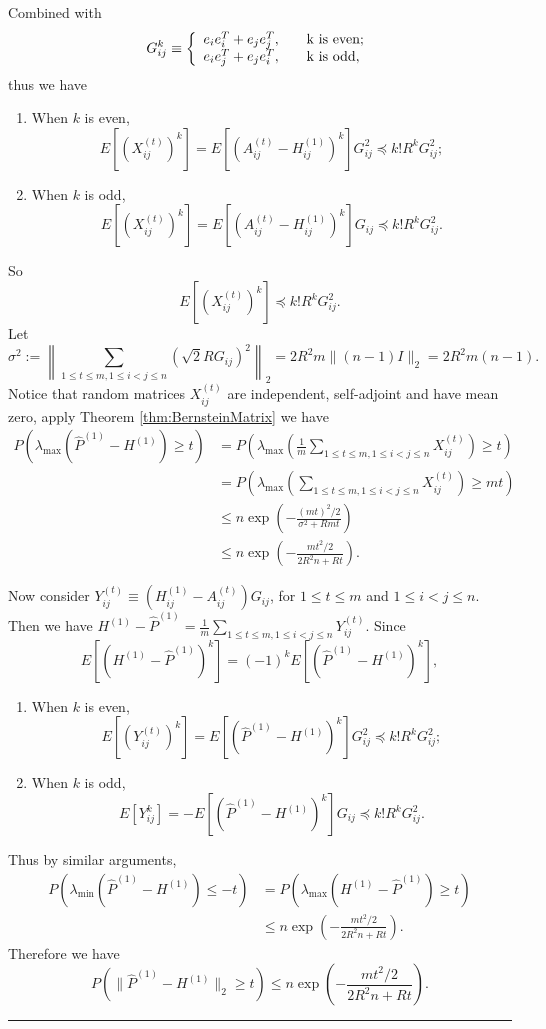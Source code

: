 \documentclass[a4paper]{article}
\newenvironment{proof}{{\bf Proof:  }}{\hfill\rule{2mm}{2mm}}
\begin{document}
\begin{proof}
Combined with
\[
    G_{ij}^k \equiv \left\{
    \begin{array}{l l}
        e_i e_i^T + e_j e_j^T, \quad & $k$ \text{ is even};\\
        e_i e_j^T + e_j e_i^T, \quad & $k$ \text{ is odd},
    \end{array}
    \right.
\]
thus we have
\begin{enumerate}
\item When $k$ is even,
\[
E[(X_{ij}^{(t)})^k] = E[(A^{(t)}_{ij} - H^{(1)}_{ij})^k] G_{ij}^2 \preceq k! R^k G_{ij}^2;
\]
\item When $k$ is odd,
\[
E[(X_{ij}^{(t)})^k] = E[(A^{(t)}_{ij} - H^{(1)}_{ij})^k] G_{ij} \preceq k! R^k G_{ij}^2.
\]
\end{enumerate}
So
\[
E[(X_{ij}^{(t)})^k] \preceq k! R^k G_{ij}^2.
\]
Let
\[
	\sigma^2 := \left\| \sum_{1 \le t \le m, 1 \le i < j \le n} (\sqrt{2} R G_{ij})^2 \right\|_2 = 2 R^2 m \| (n - 1) I \|_2 = 2 R^2 m (n - 1).
\]
Notice that random matrices $X_{ij}^{(t)}$ are independent, self-adjoint and have mean zero, apply Theorem \ref{thm:BernsteinMatrix} we have
\begin{align*}
	P \left( \lambda_{\max}(\hat{P}^{(1)} - H^{(1)}) \ge t \right)
	& = P \left( \lambda_{\max}(\frac{1}{m} \sum_{1 \le t \le m, 1 \le i < j \le n} X_{ij}^{(t)}) \ge t \right) \\
	& = P \left( \lambda_{\max}(\sum_{1 \le t \le m, 1 \le i < j \le n} X_{ij}^{(t)}) \ge m t \right) \\
	& \le n \exp \left( - \frac{(m t)^2/2}{\sigma^2 + R m t} \right) \\
	& \le n \exp \left( - \frac{m t^2/2}{2 R^2 n + R t} \right).
\end{align*}

Now consider $Y_{ij}^{(t)} \equiv \left( H_{ij}^{(1)} - A_{ij}^{(t)} \right) G_{ij}$, for $1 \le t \le m$ and $1 \le i < j \le n$. Then we have $H^{(1)} - \hat{P}^{(1)} = \frac{1}{m} \sum_{1 \le t \le m, 1 \le i < j \le n} Y_{ij}^{(t)}$.
Since
\[
	E[(H^{(1)} - \hat{P}^{(1)})^k]
    = (-1)^k E[(\hat{P}^{(1)} - H^{(1)})^k],
\]
\begin{enumerate}
\item When $k$ is even,
\[
E[(Y_{ij}^{(t)})^k] = E[(\hat{P}^{(1)} - H^{(1)})^k] G_{ij}^2 \preceq k! R^k G_{ij}^2;
\]
\item When $k$ is odd,
\[
E[Y_{ij}^k] = - E[(\hat{P}^{(1)} - H^{(1)})^k] G_{ij} \preceq k! R^k G_{ij}^2.
\]
\end{enumerate}
Thus by similar arguments,
\begin{align*}
	P \left( \lambda_{\min}(\hat{P}^{(1)} - H^{(1)}) \le -t \right) &
    = P \left( \lambda_{\max}(H^{(1)} - \hat{P}^{(1)}) \ge t \right) \\
    & \le n \exp \left( - \frac{m t^2/2}{2 R^2 n + R t} \right).
\end{align*}
Therefore we have
\[
	P \left( \| \hat{P}^{(1)} - H^{(1)} \|_2 \ge t \right)
    \le n \exp \left( - \frac{m t^2/2}{2 R^2 n + R t} \right).
\]


\end{proof}
\end{document}
